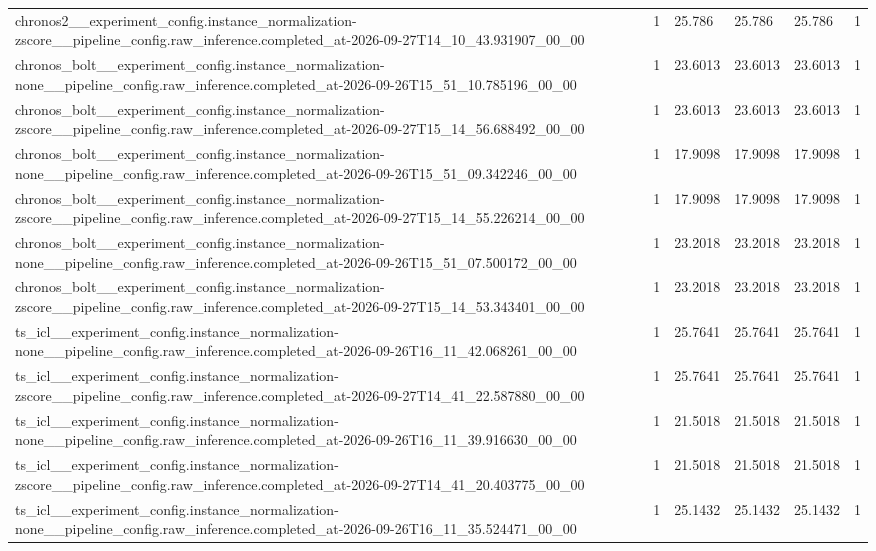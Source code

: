 \begin{tabular}{llllll}
chronos2\_\_experiment\_config.instance\_normalization-zscore\_\_pipeline\_config.raw\_inference.completed\_at-2026-09-27T14\_10\_43.931907\_00\_00 & 1 & 25.786 & 25.786 & 25.786 & 1 \\
chronos\_bolt\_\_experiment\_config.instance\_normalization-none\_\_pipeline\_config.raw\_inference.completed\_at-2026-09-26T15\_51\_10.785196\_00\_00 & 1 & 23.6013 & 23.6013 & 23.6013 & 1 \\
chronos\_bolt\_\_experiment\_config.instance\_normalization-zscore\_\_pipeline\_config.raw\_inference.completed\_at-2026-09-27T15\_14\_56.688492\_00\_00 & 1 & 23.6013 & 23.6013 & 23.6013 & 1 \\
chronos\_bolt\_\_experiment\_config.instance\_normalization-none\_\_pipeline\_config.raw\_inference.completed\_at-2026-09-26T15\_51\_09.342246\_00\_00 & 1 & 17.9098 & 17.9098 & 17.9098 & 1 \\
chronos\_bolt\_\_experiment\_config.instance\_normalization-zscore\_\_pipeline\_config.raw\_inference.completed\_at-2026-09-27T15\_14\_55.226214\_00\_00 & 1 & 17.9098 & 17.9098 & 17.9098 & 1 \\
chronos\_bolt\_\_experiment\_config.instance\_normalization-none\_\_pipeline\_config.raw\_inference.completed\_at-2026-09-26T15\_51\_07.500172\_00\_00 & 1 & 23.2018 & 23.2018 & 23.2018 & 1 \\
chronos\_bolt\_\_experiment\_config.instance\_normalization-zscore\_\_pipeline\_config.raw\_inference.completed\_at-2026-09-27T15\_14\_53.343401\_00\_00 & 1 & 23.2018 & 23.2018 & 23.2018 & 1 \\
ts\_icl\_\_experiment\_config.instance\_normalization-none\_\_pipeline\_config.raw\_inference.completed\_at-2026-09-26T16\_11\_42.068261\_00\_00 & 1 & 25.7641 & 25.7641 & 25.7641 & 1 \\
ts\_icl\_\_experiment\_config.instance\_normalization-zscore\_\_pipeline\_config.raw\_inference.completed\_at-2026-09-27T14\_41\_22.587880\_00\_00 & 1 & 25.7641 & 25.7641 & 25.7641 & 1 \\
ts\_icl\_\_experiment\_config.instance\_normalization-none\_\_pipeline\_config.raw\_inference.completed\_at-2026-09-26T16\_11\_39.916630\_00\_00 & 1 & 21.5018 & 21.5018 & 21.5018 & 1 \\
ts\_icl\_\_experiment\_config.instance\_normalization-zscore\_\_pipeline\_config.raw\_inference.completed\_at-2026-09-27T14\_41\_20.403775\_00\_00 & 1 & 21.5018 & 21.5018 & 21.5018 & 1 \\
ts\_icl\_\_experiment\_config.instance\_normalization-none\_\_pipeline\_config.raw\_inference.completed\_at-2026-09-26T16\_11\_35.524471\_00\_00 & 1 & 25.1432 & 25.1432 & 25.1432 & 1 \\

\end{tabular}
